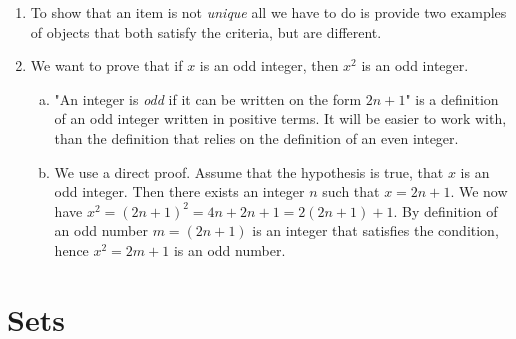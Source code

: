 \documentclass[a4paper, 11pt]{report}
\theoremstyle{plain}
\theoremstyle{definition}
\begin{document}
\begin{enumerate}
  \item To show that an item is not \textit{unique} all we have to do is
    provide two examples of objects that both satisfy the criteria, but are
    different.
 
  \item 
    We want to prove that if $x$ is an odd integer, then $x^2$ is an odd integer.
    \begin{enumerate}[a)]
      \item "An integer is \textit{odd} if it can be written on the form $2n +
        1$" is a definition of an odd integer written in positive terms. It
        will be easier to work with, than the definition that relies on the
        definition of an even integer.

      \item We use a direct proof. Assume that the hypothesis is true, that $x$
        is an odd integer. Then there exists an integer $n$ such that $x = 2n +
        1$.  We now have $x^2 = (2n + 1)^2 = 4n + 2n + 1 = 2(2n + 1) + 1$. By
        definition of an odd number $m = (2n + 1)$ is an integer that satisfies
        the condition, hence $x^2 = 2m + 1$ is an odd number.
    \end{enumerate}
  
\end{enumerate}
\chapter{Sets}
\label{cha:sets}
\printindex
\end{document}
